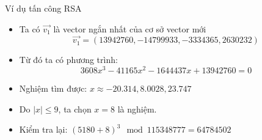 \begin{frame}{Ví dụ tấn công RSA}

\begin{itemize}
\item Ta có $\vec{v_1}$ là vector ngắn nhất của cơ sở vector mới
\[
\vec{v_1} = (13942760, -14799933, -3334365, 2630232)
\]
\item Từ đó ta có phương trình:
\[
3608x^3 - 41165x^2 - 1644437x + 13942760 = 0
\]
\item Nghiệm tìm được: $x \approx -20.314, 8.0028, 23.747$
\item Do $|x| \leq 9$, ta chọn $x = 8$ là nghiệm.
\item Kiểm tra lại: $(5180+8)^3 \mod 115348777 = 64784502$
\end{itemize}


\end{frame}
